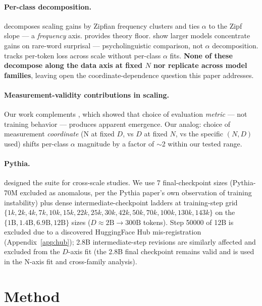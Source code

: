 \documentclass[10pt]{article}
\begin{document}
\paragraph{Per-class decomposition.}
\citet{michaud2023quantization} decomposes scaling gains by Zipfian
frequency clusters and ties $\alpha$ to the Zipf slope --- a
\emph{frequency} axis. \citet{hutter2021learning} provides theory
floor. \citet{oh2024surprisal} show larger models concentrate gains
on rare-word surprisal --- psycholinguistic comparison, not $\alpha$
decomposition. \citet{xia2023training} tracks per-token loss across
scale without per-class $\alpha$ fits. \textbf{None of these decompose
along the data axis at fixed $N$ nor replicate across model
families}, leaving open the coordinate-dependence question this paper
addresses.

\paragraph{Measurement-validity contributions in scaling.}
Our work complements \citet{schaeffer2023emergent}, which showed
that choice of evaluation \emph{metric} --- not training behavior ---
produces apparent emergence. Our analog: choice of measurement
\emph{coordinate} (N at fixed $D$, vs $D$ at fixed $N$, vs the
specific $(N, D)$ used) shifts per-class $\alpha$ magnitude by a
factor of $\sim$2 within our tested range.

\paragraph{Pythia.} \citet{biderman2023pythia} designed the suite for
cross-scale studies. We use 7 final-checkpoint sizes (Pythia-70M
excluded as anomalous, per the Pythia paper's own observation of
training instability) plus dense intermediate-checkpoint ladders at
training-step grid $\{1k, 2k, 4k, 7k, 10k, 15k, 22k, 25k, 30k, 42k,
50k, 70k, 100k, 130k, 143k\}$ on the $\{1\text{B}, 1.4\text{B},
6.9\text{B}, 12\text{B}\}$ sizes ($D \approx 2\text{B} \to
300\text{B}$ tokens). Step 50000 of 12B is excluded due to a
discovered HuggingFace Hub mis-registration (Appendix~\ref{app:hub});
2.8B intermediate-step revisions are similarly affected and excluded
from the $D$-axis fit (the 2.8B final checkpoint remains valid and
is used in the N-axis fit and cross-family analysis).

\section{Method}
\end{document}
